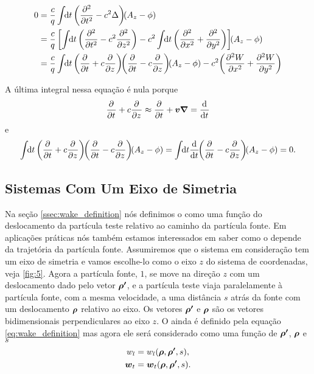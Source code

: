 \begin{equation}\begin{aligned}
0
&=\frac{c}{q}\udefint{t}{\left(\derpar[2]{}{t}-c^2\Delta\right)\!\!(A_z-\phi)}\\
&=\frac{c}{q}\left[\udefint{t}{\left(\derpar[2]{}{t} - c^2\derpar[2]{}{z}\right)} -
	            c^2\udefint{t}{\left(\derpar[2]{}{x} + \derpar[2]{}{y}\right)}\right]\!\!(A_z-\phi)\\
&=\frac{c}{q}\udefint{t}{\left(\derpar{}{t}+c\derpar{}{z}\right)
				     \!\!\left(\derpar{}{t}-c\derpar{}{z}\right)\!\!(A_z -\phi)}
   -c^2\!\left(\derpar[2]{W}{x} + \derpar[2]{W}{y}\right)
\end{aligned}\end{equation}

A última integral nessa equação é nula porque
\begin{equation}
    \frac{\partial^{{}}}{\partial t^{{}}} + c\frac{\partial^{{}}}{\partial z^{{}}} \approx \frac{\partial^{{}}}{\partial t^{{}}} + \boldsymbol{v\nabla} = \frac{\mathrm{d}^{{}}}{\mathrm{d} t^{{}}}
\end{equation}
e
\begin{equation}
  \udefint{t}{\left(\derpar{}{t} + c\derpar{}{z}\right)\!\!
             \left(\derpar{}{t} - c\derpar{}{z}\right)\!\!(A_z - \phi)}
  = \udefint{t}{\dertot{}{t}\!\!\left(\derpar{}{t}-c\derpar{}{z}\right)\!\!(A_z - \phi)}
  =  0.
\end{equation}

\subsection{Sistemas Com Um Eixo de Simetria}
Na seção \ref{ssec:wake_definition} nós definimos o  como uma função do deslocamento da partícula teste relativo ao caminho da partícula fonte. Em aplicações práticas nós também estamos interessados em saber como o  depende da trajetória da partícula fonte. Assumiremos que o sistema em consideração tem um eixo de simetria e vamos escolhe-lo como o eixo $z$ do sistema de coordenadas, veja \ref{fig:5}. Agora a partícula fonte, $1$, se move na direção $z$ com um deslocamento dado pelo vetor $\boldsymbol{\rho'}$, e a partícula teste viaja paralelamente à partícula fonte, com a mesma velocidade, a uma distância $s$ atrás da fonte com um deslocamento $\boldsymbol{\rho}$ relativo ao eixo. Os vetores $\boldsymbol{\rho'}$ e $\boldsymbol{\rho}$ são os vetores bidimensionais perpendiculares ao eixo $z$. O  ainda é definido pela equação \eqref{eq:wake_definition} mas agora ele será considerado como uma função de $\boldsymbol{\rho'}$, $\boldsymbol{\rho}$ e $s$
\begin{equation}\begin{aligned}
w_l &= w_l(\boldsymbol{\rho},\boldsymbol{\rho'},s), \\
\boldsymbol{w}_t &= \boldsymbol{w}_t(\boldsymbol{\rho},\boldsymbol{\rho'},s).
\end{aligned}\end{equation}

